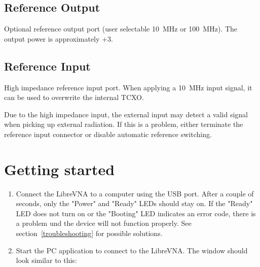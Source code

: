\documentclass[a4paper,11pt]{article}
\newcommand\info[1][5ex]{%
  \renewcommand\stacktype{L}%
  \scaleto{\stackon[1.2pt]{\color{blue}$\bigcirc$}{\raisebox{-1.5pt}{\small i}}}{#1}%
}
\newenvironment{information}[1][]{%
   \begin{mdframed}[%
      backgroundcolor={blue!15}, hidealllines=true,
      skipabove=0.7\baselineskip, skipbelow=0.7\baselineskip,
      splitbottomskip=2pt, splittopskip=4pt, #1]%
   \makebox[0pt]{%
      \smash{%
         \hspace*{-45pt}%
         \raisebox{-5pt}{%
            {\info}%
         }%
      }%
   }%
}{\end{mdframed}}
\newcommand{\vna}{LibreVNA}
\begin{document}
\subsection{Reference Output}
Optional reference output port (user selectable \SI{10}{\mega\hertz} or \SI{100}{\mega\hertz}). The output power is approximately +\SI{3}{\dBm}.
\subsection{Reference Input}
High impedance reference input port. When applying a \SI{10}{\mega\hertz} input signal, it can be used to overwrite the internal TCXO.
\begin{information}
Due to the high impedance input, the external input may detect a valid signal when picking up external radiation. If this is a problem, either terminate the reference input connector or disable automatic reference switching.
\end{information}

\section{Getting started}
\begin{enumerate}
\item Connect the \vna{} to a computer using the USB port. After a couple of seconds, only the "Power" and "Ready" LEDs should stay on. If the "Ready" LED does not turn on or the "Booting" LED indicates an error code, there is a problem und the device will not function properly. See section~\ref{troubleshooting} for possible solutions.
\item Start the PC application to connect to the \vna{}. The window should look similar to this:
\end{enumerate}
\end{document}
